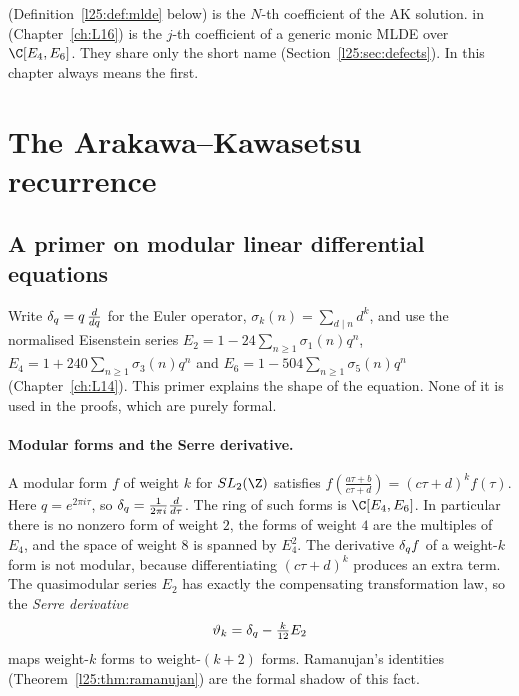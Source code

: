 \begin{warning}[title={Two different \texttt{mldeCoeff}}]
 (Definition~\ref{l25:def:mlde} below) is the
$N$-th coefficient of the AK solution. 
in  (Chapter~\ref{ch:L16}) is the $j$-th coefficient
of a generic monic MLDE over $\C[E_4,E_6]$. They share only the short name (Section~\ref{l25:sec:defects}). In
this chapter  always means the first.
\end{warning}

\section{The Arakawa--Kawasetsu recurrence}\label{l25:sec:recurrence}

\subsection{A primer on modular linear differential equations}\label{l25:sec:primer}

Write $\delta_q=q\,\frac{d}{dq}$ for the Euler operator, $\sigma_k(n)=\sum_{d\mid n}d^k$, and use the normalised
Eisenstein series $E_2=1-24\sum_{n\ge1}\sigma_1(n)q^n$, $E_4=1+240\sum_{n\ge1}\sigma_3(n)q^n$ and
$E_6=1-504\sum_{n\ge1}\sigma_5(n)q^n$ (Chapter~\ref{ch:L14}). This primer explains the shape of the equation. None of
it is used in the proofs, which are purely formal.

\paragraph{Modular forms and the Serre derivative.} A modular form $f$ of weight $k$ for $SL_2(\Z)$ satisfies
$f(\frac{a\tau+b}{c\tau+d})=(c\tau+d)^kf(\tau)$. Here $q=e^{2\pi i\tau}$, so $\delta_q=\frac1{2\pi i}\frac{d}{d\tau}$.
The ring of such forms is $\C[E_4,E_6]$. In particular there is no nonzero form of weight $2$, the forms of weight $4$
are the multiples of $E_4$, and the space of weight $8$ is spanned by $E_4^2$. The derivative $\delta_q f$ of a
weight-$k$ form is not modular, because differentiating $(c\tau+d)^k$ produces an extra term. The quasimodular series
$E_2$ has exactly the compensating transformation law, so the \emph{Serre derivative}
\begin{equation*}
\vartheta_k=\delta_q-\tfrac{k}{12}E_2
\end{equation*}
maps weight-$k$ forms to weight-$(k+2)$ forms. Ramanujan's identities (Theorem~\ref{l25:thm:ramanujan}) are the formal
shadow of this fact.

